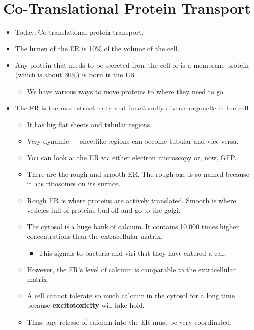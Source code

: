 \documentclass[../notes.tex]{subfiles}
\begin{document}
\section{Co-Translational Protein Transport}
\begin{itemize}
    \item {}Today: Co-translational protein transport.
    \item The lumen of the ER is 10\% of the volume of the cell.
    \item Any protein that needs to be secreted from the cell or is a membrane protein (which is about 30\%) is born in the ER.
    \begin{itemize}
        \item We have various ways to move proteins to where they need to go.
    \end{itemize}
    \item The ER is the most structurally and functionally diverse organelle in the cell.
    \begin{itemize}
        \item It has big flat sheets and tubular regions.
        \item Very dynamic --- sheetlike regions can become tubular and vice versa.
        \item You can look at the ER via either electron microscopy or, now, GFP.
        \item There are the rough and smooth ER. The rough one is so named because it has ribosomes on its surface.
        \item Rough ER is where proteins are actively translated. Smooth is where vesicles full of proteins bud off and go to the golgi.
        \item The cytosol is a huge bank of calcium. It contains 10,000 times higher concentrations than the extracellular matrix.
        \begin{itemize}
            \item This signals to bacteria and viri that they have entered a cell.
        \end{itemize}
        \item However, the ER's level of calcium is comparable to the extracellular matrix.
        \item A cell cannot tolerate so much calcium in the cytosol for a long time because \textbf{excitotoxicity} will take hold.
        \item Thus, any release of calcium into the ER must be very coordinated.
    \end{itemize}

\end{itemize}
\end{document}
